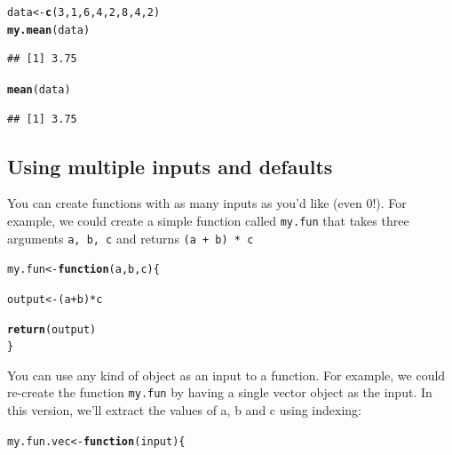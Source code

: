 \documentclass{tufte-book}\usepackage[]{graphicx}\usepackage[]{color}
\makeatletter
\newcommand{\hlnum}[1]{\textcolor[rgb]{0.686,0.059,0.569}{#1}}%
\newcommand{\hlopt}[1]{\textcolor[rgb]{0,0,0}{#1}}%
\newcommand{\hlstd}[1]{\textcolor[rgb]{0.345,0.345,0.345}{#1}}%
\newcommand{\hlkwa}[1]{\textcolor[rgb]{0.161,0.373,0.58}{\textbf{#1}}}%
\newcommand{\hlkwb}[1]{\textcolor[rgb]{0.69,0.353,0.396}{#1}}%
\newcommand{\hlkwc}[1]{\textcolor[rgb]{0.333,0.667,0.333}{#1}}%
\newcommand{\hlkwd}[1]{\textcolor[rgb]{0.737,0.353,0.396}{\textbf{#1}}}%
\newenvironment{kframe}{%
 \def\at@end@of@kframe{}%
 \ifinner\ifhmode%
  \def\at@end@of@kframe{\end{minipage}}%
  \begin{minipage}{\columnwidth}%
 \fi\fi%
 \def\FrameCommand##1{\hskip\@totalleftmargin \hskip-\fboxsep
 \colorbox{shadecolor}{##1}\hskip-\fboxsep
     \hskip-\linewidth \hskip-\@totalleftmargin \hskip\columnwidth}%
 \MakeFramed {\advance\hsize-\width
   \@totalleftmargin\z@ \linewidth\hsize
   \@setminipage}}%
 {\par\unskip\endMakeFramed%
 \at@end@of@kframe}
\newenvironment{knitrout}{}{} %
\makeatother
\begin{document}
\begin{footnotesize}
\begin{knitrout}
\color{fgcolor}\begin{kframe}
\begin{alltt}
\hlstd{data} \hlkwb{<-} \hlkwd{c}\hlstd{(}\hlnum{3}\hlstd{,} \hlnum{1}\hlstd{,} \hlnum{6}\hlstd{,} \hlnum{4}\hlstd{,} \hlnum{2}\hlstd{,} \hlnum{8}\hlstd{,} \hlnum{4}\hlstd{,} \hlnum{2}\hlstd{)}
\hlkwd{my.mean}\hlstd{(data)}
\end{alltt}
\begin{verbatim}
## [1] 3.75
\end{verbatim}
\begin{alltt}
\hlkwd{mean}\hlstd{(data)}
\end{alltt}
\begin{verbatim}
## [1] 3.75
\end{verbatim}
\end{kframe}
\end{knitrout}

\subsection{Using multiple inputs and defaults}

You can create functions with as many inputs as you'd like (even 0!). For example, we could create a simple function called \texttt{my.fun} that takes three arguments \texttt{a, b, c} and returns \texttt{(a + b) * c}

\begin{knitrout}
\color{fgcolor}\begin{kframe}
\begin{alltt}
\hlstd{my.fun} \hlkwb{<-} \hlkwa{function}\hlstd{(}\hlkwc{a}\hlstd{,} \hlkwc{b}\hlstd{,} \hlkwc{c}\hlstd{) \{}

  \hlstd{output} \hlkwb{<-} \hlstd{(a} \hlopt{+} \hlstd{b)} \hlopt{*} \hlstd{c}

  \hlkwd{return}\hlstd{(output)}
\hlstd{\}}
\end{alltt}
\end{kframe}
\end{knitrout}

\begin{marginfigure}
You can use any kind of object as an input to a function. For example, we could re-create the function \texttt{my.fun} by having a single vector object as the input. In this version, we'll extract the values of a, b and c using indexing:
\begin{tiny}
\begin{knitrout}
\color{fgcolor}\begin{kframe}
\begin{alltt}
\hlstd{my.fun.vec} \hlkwb{<-} \hlkwa{function}\hlstd{(}\hlkwc{input}\hlstd{) \{}


\end{alltt}
\end{kframe}
\end{knitrout}
\end{tiny}
\end{marginfigure}
\end{footnotesize}
\end{document}
